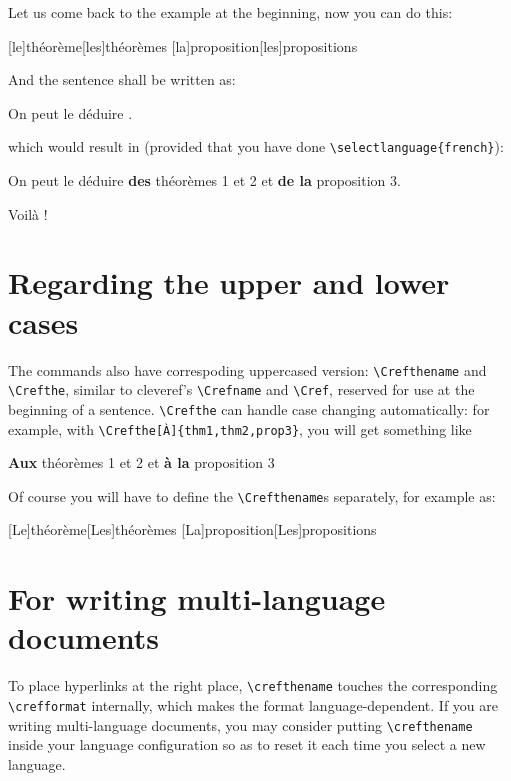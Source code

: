 \documentclass[classical]{einfart}
\newenvironment{demo}{%
    \LocallyStopLineNumbers%
    \begin{tcolorbox}[enhanced jigsaw,pad at break*=1mm,breakable,
        left=4mm,right=4mm,top=0.5mm,bottom=0mm,
        colback=gray!5!paper,boxrule=0pt,frame hidden,
        borderline west={1.5mm}{0mm}{gray!55!paper},arc=.7mm]%
}{\end{tcolorbox}\ResumeLineNumbers}
\begin{document}
Let us come back to the example at the beginning, now you can do this:

\begin{code}
[le]{théorème}[les]{théorèmes}
[la]{proposition}[les]{propositions}
\end{code}

And the sentence shall be written as:

\begin{code}
On peut le déduire .
\end{code}

which would result in (provided that you have done \lstinline|\selectlanguage{french}|):

\begin{demo}
    On peut le déduire \textbf{des} théorèmes 1 et 2 et \textbf{de la} proposition 3.
\end{demo}

Voilà !

\section{Regarding the upper and lower cases}

The commands also have correspoding uppercased version: \lstinline|\Crefthename| and \lstinline|\Crefthe|, similar to \textsf{cleveref}'s \lstinline|\Crefname| and \lstinline|\Cref|, reserved for use at the beginning of a sentence. \lstinline|\Crefthe| can handle case changing automatically: for example, with \lstinline|\Crefthe[À]{thm1,thm2,prop3}|, you will get something like

\begin{demo}
    \textbf{Aux} théorèmes 1 et 2 et \textbf{à la} proposition 3
\end{demo}

Of course you will have to define the \lstinline|\Crefthename|s separately, for example as:

\begin{code}
[Le]{théorème}[Les]{théorèmes}
[La]{proposition}[Les]{propositions}
\end{code}

\section{For writing multi-language documents}

To place hyperlinks at the right place, \lstinline|\crefthename| touches the corresponding \lstinline|\crefformat| internally, which makes the format language-dependent. If you are writing multi-language documents, you may consider putting \lstinline|\crefthename| inside your language configuration so as to reset it each time you select a new language.
\end{document}
